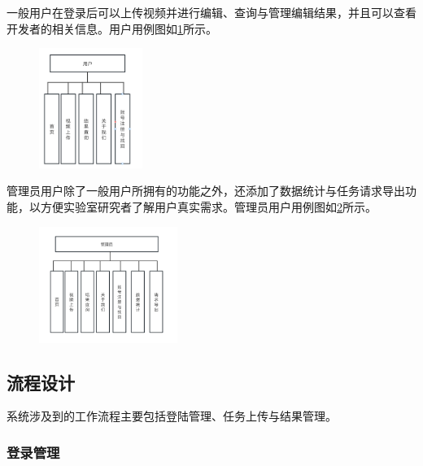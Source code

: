 一般用户在登录后可以上传视频并进行编辑、查询与管理编辑结果，并且可以查看开发者的相关信息。用户用例图如\ref{fig:user_uml}所示。
\begin{figure}[ht]
    \centering
    \includegraphics[width=0.3\textwidth]{source/img/user_uml.png}
    \label{fig:user_uml}
\end{figure}
管理员用户除了一般用户所拥有的功能之外，还添加了数据统计与任务请求导出功能，以方便实验室研究者了解用户真实需求。管理员用户用例图如\ref{fig:admin_uml}所示。
\begin{figure}[ht]
    \centering
    \includegraphics[width=0.4\textwidth]{source/img/admin_uml.png}
    \label{fig:admin_uml}
\end{figure}

\subsection{流程设计}

系统涉及到的工作流程主要包括登陆管理、任务上传与结果管理。

\subsubsection{登录管理}

